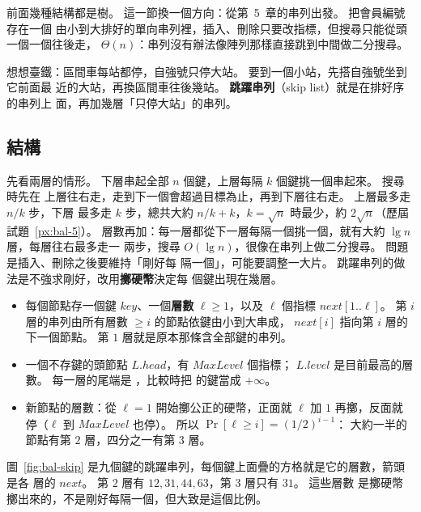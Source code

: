 前面幾種結構都是樹。 這一節換一個方向：從第~5~章的串列出發。 把會員編號存在一個
由小到大排好的單向串列裡，插入、刪除只要改指標，但搜尋只能從頭一個一個往後走，
$\Theta(n)$：串列沒有辦法像陣列那樣直接跳到中間做二分搜尋。

想想臺鐵：區間車每站都停，自強號只停大站。 要到一個小站，先搭自強號坐到它前面最
近的大站，再換區間車往後幾站。 \textbf{跳躍串列}（skip list）就是在排好序的串列上
面，再加幾層「只停大站」的串列。

\subsection{結構}
\label{sec:bal-skip-struct}

先看兩層的情形。 下層串起全部 $n$ 個鍵，上層每隔 $k$ 個鍵挑一個串起來。 搜尋時先在
上層往右走，走到下一個會超過目標為止，再到下層往右走。 上層最多走 $n/k$ 步，下層
最多走 $k$ 步，總共大約 $n/k + k$，$k = \sqrt n$ 時最少，約 $2\sqrt n$（歷屆試題~\ref{px:bal-5}）。
層數再加：每一層都從下一層每隔一個挑一個，就有大約 $\lg n$ 層，每層往右最多走一
兩步，搜尋 $O(\lg n)$，很像在串列上做二分搜尋。 問題是插入、刪除之後要維持「剛好每
隔一個」，可能要調整一大片。 跳躍串列的做法是不強求剛好，改用\textbf{擲硬幣}決定每
個鍵出現在幾層。

\begin{itemize}
\item 每個節點存一個鍵 $\mathit{key}$、一個\textbf{層數} $\ell \ge 1$，以及 $\ell$ 個指標
$\mathit{next}[1..\ell]$。 第 $i$ 層的串列由所有層數 $\ge i$ 的節點依鍵由小到大串成，
$\mathit{next}[i]$ 指向第 $i$ 層的下一個節點。 第 $1$ 層就是原本那條含全部鍵的串列。
\item 一個不存鍵的頭節點 $L.\mathit{head}$，有 $\mathit{MaxLevel}$ 個指標；
$L.\mathit{level}$ 是目前最高的層數。 每一層的尾端是 \NIL，比較時把 \NIL 的鍵當成
$+\infty$。
\item 新節點的層數：從 $\ell = 1$ 開始擲公正的硬幣，正面就 $\ell$ 加 $1$ 再擲，反面就
停（$\ell$ 到 $\mathit{MaxLevel}$ 也停）。 所以 $\Pr[\ell \ge i] = (1/2)^{i-1}$：
大約一半的節點有第 $2$ 層，四分之一有第 $3$ 層。
\end{itemize}

圖~\ref{fig:bal-skip} 是九個鍵的跳躍串列，每個鍵上面疊的方格就是它的層數，箭頭是各
層的 $\mathit{next}$。 第 $2$ 層有 $12, 31, 44, 63$，第 $3$ 層只有 $31$。 這些層數
是擲硬幣擲出來的，不是剛好每隔一個，但大致是這個比例。

